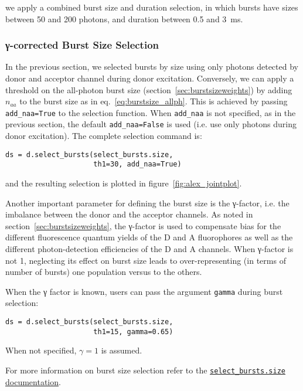we apply a combined burst size and duration selection, in which bursts
have sizes between 50 and 200 photons, and duration between 0.5 and 3~ms.

\subsubsection{γ-corrected Burst Size Selection}

In the previous section, we selected bursts by size using only photons
detected by donor and acceptor channel during donor excitation.
Conversely, we can apply a threshold on the all-photon burst size 
(section~\ref{sec:burstsizeweights}) by adding $n_{aa}$ to the burst size
as in eq.~\ref{eq:burstsize_allph}. This is achieved
by passing \verb|add_naa=True| to the selection function. When \verb|add_naa| is not specified,
as in the previous section, the default \verb|add_naa=False| is used
(i.e. use only photons during donor excitation). The complete selection command
is:

\begin{lstlisting}
ds = d.select_bursts(select_bursts.size,
                     th1=30, add_naa=True)
\end{lstlisting}

\noindent and the resulting selection is plotted in figure~\ref{fig:alex_jointplot}.

Another important parameter for defining the burst size is the γ-factor, i.e.
the imbalance between the donor and the acceptor channels. As noted in
section~\ref{sec:burstsizeweights}, the γ-factor is
used to compensate bias for the different fluorescence quantum yields of the D and A
fluorophores as well as the different photon-detection efficiencies of the D and A channels.
When γ-factor is not 1, neglecting its effect on burst size leads to
over-representing (in terms of number of bursts) one population versus to the others.

When the γ factor is known, users can pass the argument 
\verb|gamma| during burst selection:

\begin{lstlisting}
ds = d.select_bursts(select_bursts.size,
                     th1=15, gamma=0.65)
\end{lstlisting}

When not specified, $\gamma=1$ is assumed.

For more information on burst size selection refer to the
\href{http://fretbursts.readthedocs.org/en/latest/burst_selection.html#fretbursts.select\_bursts.size}{\texttt{select\_bursts.size} documentation}. 

